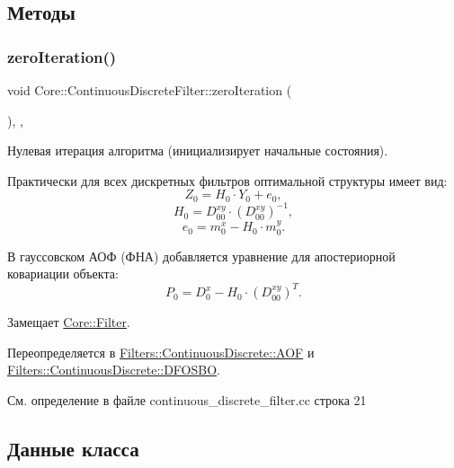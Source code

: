 \subsection{Методы}
\hypertarget{class_core_1_1_continuous_discrete_filter_acc9b18241a13d46dc92ef1f02ec13e53}{}\label{class_core_1_1_continuous_discrete_filter_acc9b18241a13d46dc92ef1f02ec13e53} 
\subsubsection{\texorpdfstring{zero\+Iteration()}{zeroIteration()}}
{\footnotesize\ttfamily void Core\+::\+Continuous\+Discrete\+Filter\+::zero\+Iteration (\begin{DoxyParamCaption}{ }\end{DoxyParamCaption})\hspace{0.3cm}{\ttfamily [override]}, {\ttfamily [protected]}, {\ttfamily [virtual]}}



Нулевая итерация алгоритма (инициализирует начальные состояния). 

Практически для всех дискретных фильтров оптимальной структуры имеет вид\+: \[Z_0 = H_0 \cdot Y_0 + e_0,\] \[H_0 = D_{00}^{xy} \cdot (D_{00}^{xy})^{-1},\] \[e_0 = m_0^x - H_0 \cdot m_0^y.\]

В гауссовском АОФ (ФНА) добавляется уравнение для апостериорной ковариации объекта\+: \[P_0 = D_0^x - H_0 \cdot (D_{00}^{xy})^T.\] 

Замещает \hyperlink{class_core_1_1_filter_af95880b734c4b8dc3d8c02f222b32506}{Core\+::\+Filter}.



Переопределяется в \hyperlink{class_filters_1_1_continuous_discrete_1_1_a_o_f_ab350a4de87a9e2c2e8b01e178d61f3b5}{Filters\+::\+Continuous\+Discrete\+::\+A\+OF} и \hyperlink{class_filters_1_1_continuous_discrete_1_1_d_f_o_s_b_o_a958c75df5031558a244d553f13376e75}{Filters\+::\+Continuous\+Discrete\+::\+D\+F\+O\+S\+BO}.



См. определение в файле continuous\+\_\+discrete\+\_\+filter.\+cc строка 21



\subsection{Данные класса}
\hypertarget{class_core_1_1_continuous_discrete_filter_a14b9176c461ca407005e653ecc987b1b}{}\label{class_core_1_1_continuous_discrete_filter_a14b9176c461ca407005e653ecc987b1b} 
